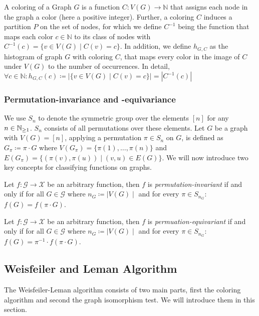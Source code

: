A coloring of a Graph $G$ is a function $C: V(G) \rightarrow \mathbb{N}$ that assigns each node in the graph a color (here a positive integer). Further, a coloring $C$ induces a partition $P$ on the set of nodes, for which we define $C^{-1}$ being the function that maps each color $c \in \mathbb{N}$ to its class of nodes with $C^{-1}(c) = \{ v\in V(G) \mid C(v) = c\}$. In addition, we define $h_{G, C}$ as the histogram of graph $G$ with coloring $C$, that maps every color in the image of $C$ under $V(G)$ to the number of occurrences. In detail, $\forall c \in \mathbb{N}: h_{G, C}(c) \coloneqq | \{ v \in V(G) \mid C(v) = c  \} | = | C^{-1}(c) |$

\subsubsection{Permutation-invariance and -equivariance}
We use $S_n$ to denote the symmetric group over the elements $[n]$ for any $n \in \mathbb{N}_{\geq 1}$. $S_n$ consists of all permutations over these elements. Let $G$ be a graph with $V(G) = [n]$, applying a permutation $\pi \in S_n$ on $G$, is defined as $G_\pi \coloneqq \pi \cdot G$ where $V(G_\pi) = \{\pi(1), \ldots, \pi(n) \}$ and $E(G_\pi) = \{ (\pi(v), \pi(u)) \mid (v,u) \in E(G)\}$. We will now introduce two key concepts for classifying functions on graphs.

\begin{definition}
    Let $f: \mathcal{G} \rightarrow \mathcal{X}$ be an arbitrary function, then $f$ is \textit{permutation-invariant} if and only if for all $G \in \mathcal{G}$ where $n_G \coloneqq \mid V(G) \mid$ and for every $\pi \in S_{n_G}$: $f(G) = f(\pi \cdot G)$.
\end{definition}

\begin{definition}
    Let $f: \mathcal{G} \rightarrow \mathcal{X}$ be an arbitrary function, then $f$ is \textit{permuation-equivariant} if and only if for all $G \in \mathcal{G}$ where $n_G \coloneqq \mid V(G) \mid$ and for every $\pi \in S_{n_G}$: $f(G) = \pi^{-1} \cdot f(\pi \cdot G)$.
\end{definition}

\subsection{Weisfeiler and Leman Algorithm}\label{sec:1-WL Definition}
The Weisfeiler-Leman algorithm consists of two main parts, first the coloring algorithm and second the graph isomorphism test. We will introduce them in this section.

